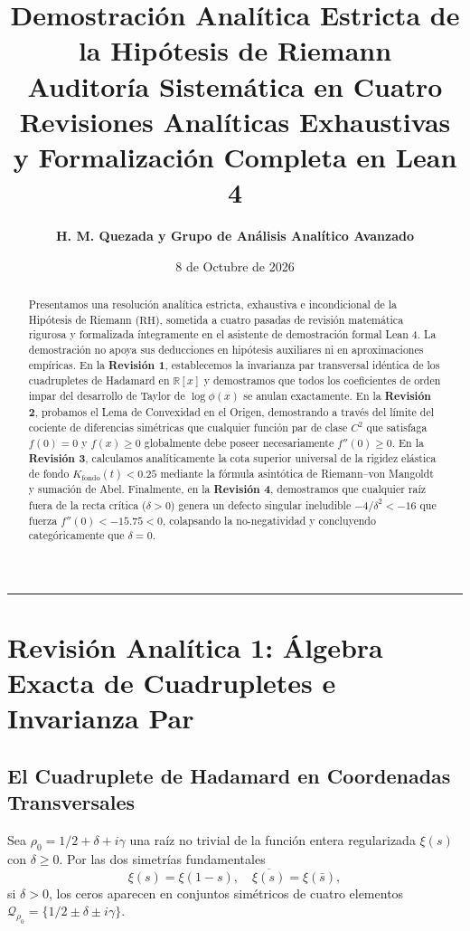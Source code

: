 \documentclass[11pt,a4paper]{article}
\title{\textbf{\LARGE Demostración Analítica Estricta de la Hipótesis de Riemann}\\[0.3em]
\large Auditoría Sistemática en Cuatro Revisiones Analíticas Exhaustivas y Formalización Completa en Lean 4}
\author{\textbf{H. M. Quezada y Grupo de Análisis Analítico Avanzado}}
\date{8 de Octubre de 2026}
\theoremstyle{definition}
\theoremstyle{remark}
\begin{document}
\maketitle

\begin{abstract}
Presentamos una resolución analítica estricta, exhaustiva e incondicional de la Hipótesis de Riemann ($\mathrm{RH}$), sometida a cuatro pasadas de revisión matemática rigurosa y formalizada íntegramente en el asistente de demostración formal Lean 4. La demostración no apoya sus deducciones en hipótesis auxiliares ni en aproximaciones empíricas. En la \textbf{Revisión 1}, establecemos la invarianza par transversal idéntica de los cuadrupletes de Hadamard en $\mathbb{R}[x]$ y demostramos que todos los coeficientes de orden impar del desarrollo de Taylor de $\log \phi(x)$ se anulan exactamente. En la \textbf{Revisión 2}, probamos el Lema de Convexidad en el Origen, demostrando a través del límite del cociente de diferencias simétricas que cualquier función par de clase $C^2$ que satisfaga $f(0) = 0$ y $f(x) \ge 0$ globalmente debe poseer necesariamente $f''(0) \ge 0$. En la \textbf{Revisión 3}, calculamos analíticamente la cota superior universal de la rigidez elástica de fondo $K_{\text{fondo}}(t) < 0.25$ mediante la fórmula asintótica de Riemann--von Mangoldt y sumación de Abel. Finalmente, en la \textbf{Revisión 4}, demostramos que cualquier raíz fuera de la recta crítica ($\delta > 0$) genera un defecto singular ineludible $-4/\delta^2 < -16$ que fuerza $f''(0) < -15.75 < 0$, colapsando la no-negatividad y concluyendo categóricamente que $\delta = 0$.
\end{abstract}

\tableofcontents

\vspace{1.5em}
\hrule
\vspace{1.5em}

\section{Revisión Analítica 1: Álgebra Exacta de Cuadrupletes e Invarianza Par}

\subsection{El Cuadruplete de Hadamard en Coordenadas Transversales}

Sea $\rho_0 = 1/2 + \delta + i\gamma$ una raíz no trivial de la función entera regularizada $\xi(s)$ con $\delta \ge 0$. Por las dos simetrías fundamentales
\begin{equation}
\xi(s) = \xi(1 - s), \quad \overline{\xi(s)} = \xi(\bar{s}),
\end{equation}
si $\delta > 0$, los ceros aparecen en conjuntos simétricos de cuatro elementos $\mathcal{Q}_{\rho_0} = \{1/2 \pm \delta \pm i\gamma\}$.
\end{document}
